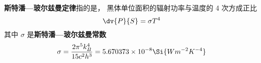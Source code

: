 
\textbf{斯特潘—玻尔兹曼定律}指的是， 黑体单位面积的辐射功率与温度的 4 次方成正比
\begin{equation}
\dv{P}{S} = \sigma T^4
\end{equation}
其中 $\sigma$ 是\textbf{斯特潘—玻尔兹曼常数}
\begin{equation}
\sigma = \frac{2\pi^5k_B^4}{15c^2h^3} = 5.670373 \times 10^{-8} \Si{Wm^{-2}K^{-4}}
\end{equation}
